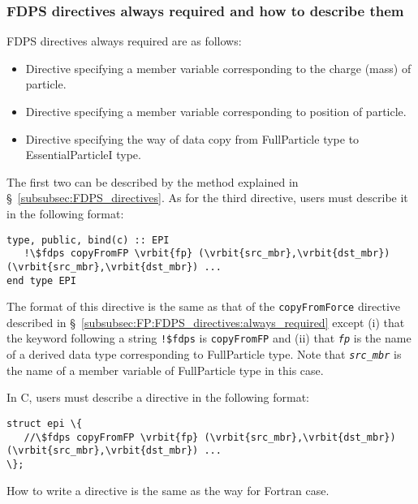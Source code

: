 \subsubsection{FDPS directives always required and how to describe them}
\label{subsubsec:EPI:FDPS_directives:always_required}
FDPS directives always required are as follows:
\begin{itemize}[leftmargin=*,itemsep=-1ex]
\item Directive specifying a member variable corresponding to the charge (mass) of particle.
\item Directive specifying a member variable corresponding to position of particle.
\item Directive specifying the way of data copy from FullParticle type to EssentialParticleI type.
\end{itemize}
The first two can be described by the method explained in \S~\ref{subsubsec:FDPS_directives}. As for the third directive, users must describe it in the following format:
\begin{screen}
\begin{Verbatim}[commandchars=\\\{\}]
type, public, bind(c) :: EPI
   !\$fdps copyFromFP \vrbit{fp} (\vrbit{src_mbr},\vrbit{dst_mbr}) (\vrbit{src_mbr},\vrbit{dst_mbr}) ...
end type EPI
\end{Verbatim}
\end{screen}
The format of this directive is the same as that of the \texttt{copyFromForce} directive described in \S~\ref{subsubsec:FP:FDPS_directives:always_required} except (i) that the keyword following a string \verb|!$fdps| is \texttt{copyFromFP} and (ii) that \textit{\texttt{fp}} is the name of a derived data type corresponding to FullParticle type. Note that \textit{\texttt{src\_mbr}} is the name of a member variable of FullParticle type in this case.

In C, users must describe a directive in the following format:
\begin{screen}
\begin{Verbatim}[commandchars=\\\{\}]
struct epi \{
   //\$fdps copyFromFP \vrbit{fp} (\vrbit{src_mbr},\vrbit{dst_mbr}) (\vrbit{src_mbr},\vrbit{dst_mbr}) ...
\};
\end{Verbatim}
\end{screen}
How to write a directive is the same as the way for Fortran case.



